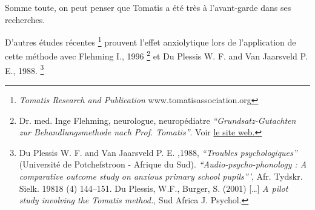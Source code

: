 Somme toute, on peut penser que Tomatis a été très à l'avant-garde
dans ses recherches.

D'autres études récentes \footnote{\emph{Tomatis Research and Publication} www.tomatisassociation.org}  prouvent l'effet anxiolytique lors de
l'application de cette
méthode avec Flehming
I., 1996 \footnote{Dr. med. Inge Flehming,
	neurologue, neuropédiatre \emph{``Grundsatz-Gutachten zur Behandlungsmethode
		nach Prof. Tomatis''}. Voir 
\href{http://www.analytische-hoertherapie.de/uploads/tx\_templavoila/Grundsatzgu
tachten\_zur\_Behandlungsmethode\_nach\_Prof.\_Tomatis.pdf}{le site
web.}} et Du Plessis W. F. and Van Jaarsveld P. E., 1988.
 \footnote{Du Plessis W. F. and Van Jaarsveld P. E. ,1988, \textit{``Troubles 
psychologiques''} (Université de Potchefstroon
- Afrique du Sud). 
	\textit{``Audio-psycho-phonology : A comparative outcome study on anxious 
primary school pupils'''},  Afr. Tydskr. Sielk. 19818 (4) 144--151. Du Plessis, W.F., Burger, S. (2001) [\ldots]
	\emph{A pilot study involving the Tomatis method.}, Sud Africa J. 
Psychol.}
 

















